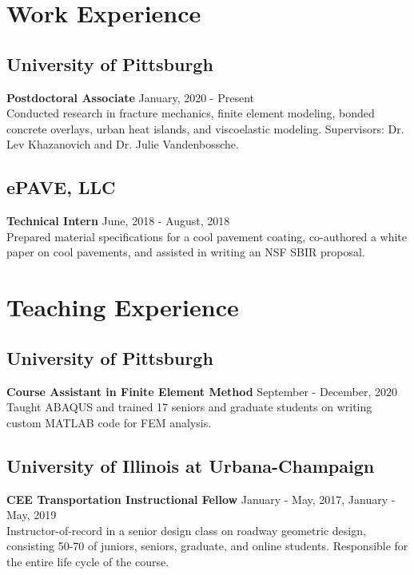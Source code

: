 \documentclass[12pt]{article}
\begin{document}
\bigskip
\section*{Work Experience}
\subsection*{University of Pittsburgh}
\textbf{Postdoctoral Associate} \hfill January, 2020 - Present \\
Conducted research in fracture mechanics, finite element modeling, bonded concrete overlays, urban heat islands, and viscoelastic modeling. Supervisors: Dr. Lev Khazanovich and Dr. Julie Vandenbossche.

\subsection*{ePAVE, LLC}
\textbf{Technical Intern} \hfill June, 2018 - August, 2018 \\
Prepared material specifications for a cool pavement coating, co-authored a white paper on cool pavements, and assisted in writing an NSF SBIR proposal. 

\bigskip
\section*{Teaching Experience}
\subsection*{University of Pittsburgh}
\textbf{Course Assistant in Finite Element Method} \hfill September - December, 2020 \\
Taught ABAQUS and trained 17 seniors and graduate students on writing custom MATLAB code for FEM analysis.

\subsection*{University of Illinois at Urbana-Champaign}
\textbf{CEE Transportation Instructional Fellow} \hfill January - May, 2017, January - May, 2019 \\
Instructor-of-record in a senior design class on roadway geometric design, consisting 50-70 of juniors, seniors, graduate, and online students. Responsible for the entire life cycle of the course.
\end{document}
